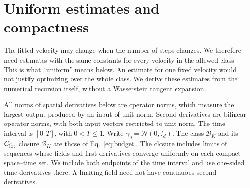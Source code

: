 \section{Uniform estimates and compactness}
\label{app:uniform}

The fitted velocity may change when the number of steps changes. We therefore
need estimates with the same constants for every velocity in the allowed
class. This is what ``uniform'' means below. An estimate for one fixed
velocity would not justify optimizing over the whole class. We derive these
estimates from the numerical recursion itself, without a Wasserstein tangent
expansion.\AIassistance

All norms of spatial derivatives below are operator norms, which measure the
largest output produced by an input of unit norm. Second derivatives are
bilinear operator norms, with both input vectors restricted to unit norm.
The time interval is $[0,T]$, with $0<T\le1$. Write $\gamma_d=\mathcal N(0,I_d)$.
The class $\mathcal B_K$ and its $C^1_{\rm loc}$ closure $\overline{\mathcal B}_K$
are those of Eq.~\eqref{eq:budget}. The closure includes limits of sequences
whose fields and first derivatives converge uniformly on each compact
space--time set. We include both endpoints of the time interval and use
one-sided time derivatives there.
A limiting field need not have continuous second derivatives.


